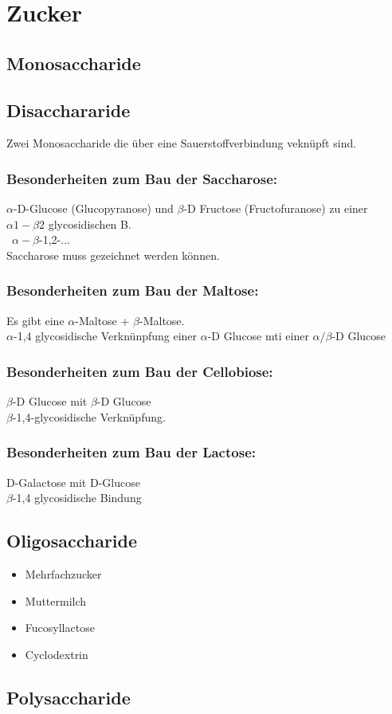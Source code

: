 \section{Zucker}

\subsection{Monosaccharide}

\subsection{Disacchararide}
Zwei Monosaccharide die über eine Sauerstoffverbindung veknüpft sind.
\subsubsection{Besonderheiten zum Bau der Saccharose:}
$\alpha$-D-Glucose (Glucopyranose) und $\beta$-D Fructose (Fructofuranose) zu einer $\alpha 1 -\beta 2$ glycosidischen B. \\ 
\textrightarrow\ $\alpha-\beta$-1,2-... \\
Saccharose muss gezeichnet werden können.

\subsubsection{Besonderheiten zum Bau der Maltose:}
Es gibt eine $\alpha$-Maltose + $\beta$-Maltose. \\
$\alpha$-1,4 glycosidische Verknünpfung einer $\alpha$-D Glucose mti einer $\alpha/\beta$-D Glucose

\subsubsection{Besonderheiten zum Bau der Cellobiose:}
$\beta$-D Glucose mit $\beta$-D Glucose \\
$\beta$-1,4-glycosidische Verknüpfung.

\subsubsection{Besonderheiten zum Bau der Lactose:}
D-Galactose mit D-Glucose \\
$\beta$-1,4 glycosidische Bindung

\subsection{Oligosaccharide}
\begin{itemize}
    \item Mehrfachzucker
    \item Muttermilch
    \item Fucosyllactose
    \item Cyclodextrin
\end{itemize}

\subsection{Polysaccharide}


